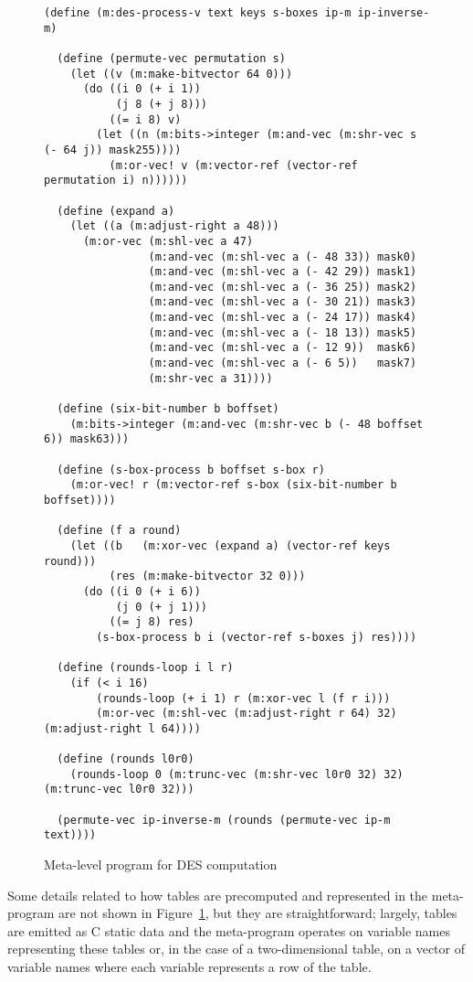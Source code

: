 \begin{figure}[hbtp]
\begin{verbatim}
(define (m:des-process-v text keys s-boxes ip-m ip-inverse-m)

  (define (permute-vec permutation s)
    (let ((v (m:make-bitvector 64 0)))
      (do ((i 0 (+ i 1))
           (j 8 (+ j 8)))
          ((= i 8) v)
        (let ((n (m:bits->integer (m:and-vec (m:shr-vec s (- 64 j)) mask255))))
          (m:or-vec! v (m:vector-ref (vector-ref permutation i) n))))))

  (define (expand a)
    (let ((a (m:adjust-right a 48)))
      (m:or-vec (m:shl-vec a 47)
                (m:and-vec (m:shl-vec a (- 48 33)) mask0)
                (m:and-vec (m:shl-vec a (- 42 29)) mask1)
                (m:and-vec (m:shl-vec a (- 36 25)) mask2)
                (m:and-vec (m:shl-vec a (- 30 21)) mask3)
                (m:and-vec (m:shl-vec a (- 24 17)) mask4)
                (m:and-vec (m:shl-vec a (- 18 13)) mask5)
                (m:and-vec (m:shl-vec a (- 12 9))  mask6)
                (m:and-vec (m:shl-vec a (- 6 5))   mask7)
                (m:shr-vec a 31))))

  (define (six-bit-number b boffset)
    (m:bits->integer (m:and-vec (m:shr-vec b (- 48 boffset 6)) mask63)))

  (define (s-box-process b boffset s-box r)
    (m:or-vec! r (m:vector-ref s-box (six-bit-number b boffset))))

  (define (f a round)
    (let ((b   (m:xor-vec (expand a) (vector-ref keys round)))
          (res (m:make-bitvector 32 0)))
      (do ((i 0 (+ i 6))
           (j 0 (+ j 1)))
          ((= j 8) res)
        (s-box-process b i (vector-ref s-boxes j) res))))

  (define (rounds-loop i l r)
    (if (< i 16)
        (rounds-loop (+ i 1) r (m:xor-vec l (f r i)))
        (m:or-vec (m:shl-vec (m:adjust-right r 64) 32) (m:adjust-right l 64))))

  (define (rounds l0r0)
    (rounds-loop 0 (m:trunc-vec (m:shr-vec l0r0 32) 32) (m:trunc-vec l0r0 32)))

  (permute-vec ip-inverse-m (rounds (permute-vec ip-m text))))
\end{verbatim}
\caption{Meta-level program for DES computation}
\label{fig:meta-level}
\end{figure}

Some details related to how tables are precomputed and represented in
the meta-program are not shown in Figure~\ref{fig:meta-level}, but they
are straightforward; largely, tables are emitted as C static data and
the meta-program operates on variable names representing these tables
or, in the case of a two-dimensional table, on a vector of variable
names where each variable represents a row of the table.


